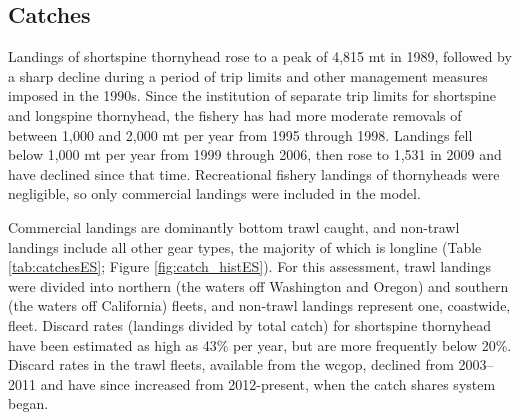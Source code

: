 \documentclass[11pt,
  english,
  letterpaper,
]{article}
\begin{document}
\hypertarget{catches}{%
\subsection*{Catches}\label{catches}}

Landings of shortspine thornyhead rose to a peak of 4,815 mt in 1989, followed by a sharp decline during a period of trip limits and other management measures imposed in the 1990s. Since the institution of separate trip limits for shortspine and longspine thornyhead, the fishery has had more moderate removals of between 1,000 and 2,000 mt per year from 1995 through 1998. Landings fell below 1,000 mt per year from 1999 through 2006, then rose to 1,531 in 2009 and have declined since that time. Recreational fishery landings of thornyheads were negligible, so only commercial landings were included in the model.

Commercial landings are dominantly bottom trawl caught, and non-trawl landings include all other gear types, the majority of which is longline (Table \ref{tab:catchesES}; Figure \ref{fig:catch_histES}). For this assessment, trawl landings were divided into northern (the waters off Washington and Oregon) and southern (the waters off California) fleets, and non-trawl landings represent one, coastwide, fleet. Discard rates (landings divided by total catch) for shortspine thornyhead have been estimated as high as 43\% per year, but are more frequently below 20\%. Discard rates in the trawl fleets, available from the \gls{wcgop}, declined from 2003--2011 and have since increased from 2012-present, when the catch shares system began.

\begingroup\fontsize{10}{12}\selectfont
\begingroup\fontsize{10}{12}\selectfont
\end{document}

